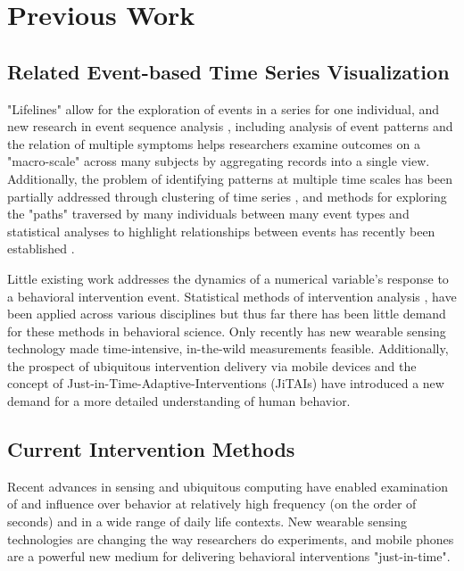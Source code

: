 \section{Previous Work}

\subsection{Related Event-based Time Series Visualization}
"Lifelines" \cite{plaisant1996} allow for the exploration of events in a series for one individual, and new research in event sequence analysis \cite{Wongsuphasawat2011}, including analysis of event patterns \cite{Wongsuphasawat2012, fails2006, vrotsou2007} and the relation of multiple symptoms \cite{wongsuphasawat2011outflow} helps researchers examine outcomes on a "macro-scale" across many subjects by aggregating records into a single view.
Additionally, the problem of identifying patterns at multiple time scales has been partially addressed through clustering of time series \cite{van1999}, and methods for exploring the "paths" traversed by many individuals between many event types and statistical analyses to highlight relationships between events has recently been established \cite{gotz2014}.

Little existing work addresses the dynamics of a numerical variable's response to a behavioral intervention event.
Statistical methods of intervention analysis \cite{box1975}, have been applied across various disciplines but thus far there has been little demand for these methods in behavioral science.
Only recently has new wearable sensing technology made time-intensive, in-the-wild measurements feasible.
Additionally, the prospect of ubiquitous intervention delivery via mobile devices and the concept of Just-in-Time-Adaptive-Interventions (JiTAIs) have introduced a new demand for a more detailed understanding of human behavior.

\subsection{Current Intervention Methods}
Recent advances in sensing and ubiquitous computing have enabled examination of and influence over behavior at relatively high frequency (on the order of seconds) and in a wide range of daily life contexts.
New wearable sensing technologies are changing the way researchers do experiments, and mobile phones are a powerful new medium for delivering behavioral interventions "just-in-time".

